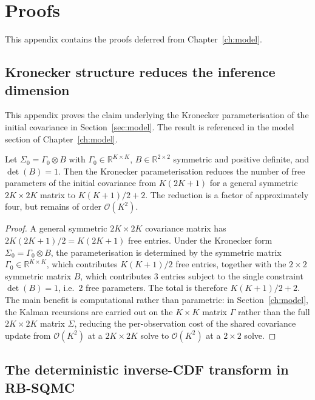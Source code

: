 \chapter{Proofs}
\label{app:proofs}

This appendix contains the proofs deferred from Chapter~\ref{ch:model}.

\section{Kronecker structure reduces the inference dimension}
\label{app:kronecker-proof}

This appendix proves the claim underlying the Kronecker parameterisation of the initial covariance in Section~\ref{sec:model}. The result is referenced in the model section of Chapter~\ref{ch:model}.

\begin{proposition}
\label{prop:kronecker-dim}
Let $\Sigma_0 = \Gamma_0 \otimes B$ with $\Gamma_0 \in \mathbb{R}^{K \times K}$, $B \in \mathbb{R}^{2 \times 2}$ symmetric and positive definite, and $\det(B) = 1$. Then the Kronecker parameterisation reduces the number of free parameters of the initial covariance from $K(2K+1)$ for a general symmetric $2K \times 2K$ matrix to $K(K+1)/2 + 2$. The reduction is a factor of approximately four, but remains of order $\mathcal{O}(K^2)$.
\end{proposition}

\begin{proof}
A general symmetric $2K \times 2K$ covariance matrix has $2K(2K+1)/2 = K(2K+1)$ free entries. Under the Kronecker form $\Sigma_0 = \Gamma_0 \otimes B$, the parameterisation is determined by the symmetric matrix $\Gamma_0 \in \mathbb{R}^{K \times K}$, which contributes $K(K+1)/2$ free entries, together with the $2 \times 2$ symmetric matrix $B$, which contributes $3$ entries subject to the single constraint $\det(B) = 1$, i.e.\ $2$ free parameters. The total is therefore $K(K+1)/2 + 2$. The main benefit is computational rather than parametric: in Section~\ref{ch:model}, the Kalman recursions are carried out on the $K \times K$ matrix $\Gamma$ rather than the full $2K \times 2K$ matrix $\Sigma$, reducing the per-observation cost of the shared covariance update from $\mathcal{O}(K^2)$ at a $2K \times 2K$ solve to $\mathcal{O}(K^2)$ at a $2 \times 2$ solve.
\end{proof}

\section{The deterministic inverse-CDF transform in RB-SQMC}
\label{app:inv-cdf-proof}

